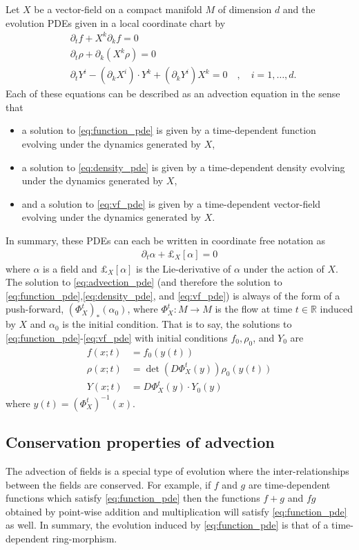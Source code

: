 \documentclass[12pt]{amsart}
\newcommand{\R}{\ensuremath{\mathbb{R}}}
\begin{document}
Let $X$ be a vector-field on a compact manifold $M$ of dimension $d$
and the evolution PDEs given in a local coordinate chart by
\begin{align}
	&\partial_t f + X^k \partial_k f= 0 \label{eq:function_pde} \\
	&\partial_t \rho + \partial_k( X^k \rho) = 0  \label{eq:density_pde} \\
	&\partial_t Y^i - (\partial_k X^i) \cdot Y^k + (\partial_k Y^i) X^k  = 0 \quad , \quad i = 1,\dots,d \label{eq:vf_pde}.
\end{align}
Each of these equations can be described as an advection equation in the sense that
\begin{itemize}
	\item a solution to \eqref{eq:function_pde} is given by a time-dependent function evolving under the dynamics generated by $X$,
	\item a solution to \eqref{eq:density_pde} is given by a time-dependent density evolving under the dynamics generated by $X$,
	\item and a solution to \eqref{eq:vf_pde} is given by a time-dependent vector-field evolving under the dynamics generated by $X$.
\end{itemize}
In summary, these PDEs can each be written in coordinate free notation as
\begin{align}
	\partial_t \alpha + \pounds_{X}[\alpha] = 0 \label{eq:advection_pde}
\end{align}
where $\alpha$ is a field and $\pounds_X[\alpha]$ is the Lie-derivative of $\alpha$ under the action of $X$.
The solution to \eqref{eq:advection_pde} (and therefore the solution to \eqref{eq:function_pde},\eqref{eq:density_pde}, and \eqref{eq:vf_pde}) is always of the form of a push-forward, $(\Phi_{X}^t)_* (\alpha_0)$, where $\Phi_{X}^t : M \to M$ is the flow at time $t \in \R$ induced by $X$ and $\alpha_0$ is the initial condition.
That is to say, the solutions to \eqref{eq:function_pde}-\eqref{eq:vf_pde} with initial conditions $f_{0},\rho_{0}$, and $Y_{0}$ are
\begin{align*}
	f(x;t) &= f_{0}( y(t) ) \\
	\rho(x;t) &= \det( D\Phi_{X}^{t} (y) ) \rho_{0}( y(t) ) \\
	Y(x;t) &= D\Phi^{t}_{X}(y) \cdot Y_{0}(y)
\end{align*}
where $y(t) = (\Phi_{X}^{t})^{-1} (x)$.

\subsection{Conservation properties of advection}
The advection of fields is a special type of evolution where the inter-relationships between the fields are conserved.
For example, if $f$ and $g$ are time-dependent functions which satisfy \eqref{eq:function_pde} then the functions $f+g$ and $fg$
obtained by point-wise addition and multiplication will satisfy \eqref{eq:function_pde} as well.
In summary, the evolution induced by \eqref{eq:function_pde} is that of a time-dependent ring-morphism.
\end{document}
